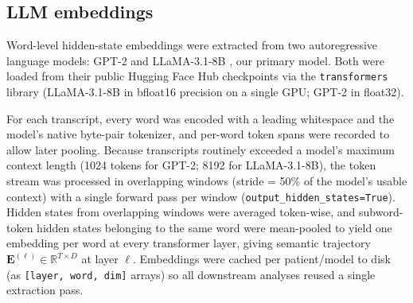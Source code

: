 
\subsection*{LLM embeddings}

Word-level hidden-state embeddings were extracted from two autoregressive
language models: GPT-2 \citep{Radford2019} and LLaMA-3.1-8B
\citep{Grattafiori2024}, our primary model. Both were loaded from their
public Hugging Face Hub checkpoints via the \texttt{transformers} library
\citep{Wolf2020} (LLaMA-3.1-8B in bfloat16 precision on a single GPU; GPT-2
in float32).

For each transcript, every word was encoded with a leading whitespace and the
model's native byte-pair tokenizer, and per-word token spans were recorded to
allow later pooling. Because transcripts routinely exceeded a model's maximum
context length (1024 tokens for GPT-2; 8192 for LLaMA-3.1-8B), the token
stream was processed in overlapping windows (stride = 50\% of the model's
usable context) with a single forward pass per window
(\texttt{output\_hidden\_states=True}). Hidden states from overlapping
windows were averaged token-wise, and subword-token hidden states belonging
to the same word were mean-pooled to yield one embedding per word at every
transformer layer, giving semantic trajectory
$\mathbf{E}^{(\ell)}\!\in\!\mathbb{R}^{T\times D}$ at layer $\ell$. Embeddings
were cached per patient/model to disk (as \texttt{[layer, word, dim]}
arrays) so all downstream analyses reused a single extraction pass.
